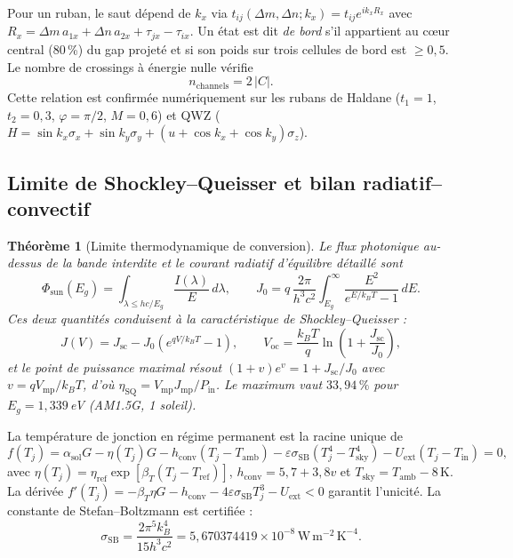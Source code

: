 \documentclass[11pt,a4paper,french]{article}
\newtheorem{theoreme}{Théorème}
\begin{document}
Pour un ruban, le saut dépend de $k_x$ via $t_{ij}(\Delta m,\Delta n;k_x)=t_{ij}e^{ik_xR_x}$ avec $R_x=\Delta m\,a_{1x}+\Delta n\,a_{2x}+\tau_{jx}-\tau_{ix}$. Un état est dit \emph{de bord} s'il appartient au cœur central (80\,\%) du gap projeté et si son poids sur trois cellules de bord est $\geq 0{,}5$. Le nombre de crossings à énergie nulle vérifie
\begin{equation}
  n_{\mathrm{channels}} = 2\,|C|.
  \label{eq:bulkedge}
\end{equation}
Cette relation est confirmée numériquement sur les rubans de Haldane ($t_1=1$, $t_2=0{,}3$, $\varphi=\pi/2$, $M=0{,}6$) et QWZ ($H=\sin k_x\sigma_x+\sin k_y\sigma_y+(u+\cos k_x+\cos k_y)\sigma_z$).

\subsection{Limite de Shockley--Queisser et bilan radiatif--convectif}

\begin{theoreme}[Limite thermodynamique de conversion]
Le flux photonique au-dessus de la bande interdite et le courant radiatif d'équilibre détaillé sont
\begin{equation}
  \Phi_{\mathrm{sun}}(E_g)=\int_{\lambda\leq hc/E_g}\frac{I(\lambda)}{E}\,d\lambda,
  \qquad
  J_0=q\,\frac{2\pi}{h^3c^2}\int_{E_g}^{\infty}\frac{E^2}{e^{E/k_BT}-1}\,dE.
  \label{eq:flux}
\end{equation}
Ces deux quantités conduisent à la caractéristique de Shockley--Queisser :
\begin{equation}
  J(V)=J_{\mathrm{sc}}-J_0\!\left(e^{qV/k_BT}-1\right),\qquad
  V_{\mathrm{oc}}=\frac{k_BT}{q}\ln\!\left(1+\frac{J_{\mathrm{sc}}}{J_0}\right),
  \label{eq:jv}
\end{equation}
et le point de puissance maximal résout $(1+v)e^v=1+J_{\mathrm{sc}}/J_0$ avec $v=qV_{\mathrm{mp}}/k_BT$, d'où $\eta_{\mathrm{SQ}}=V_{\mathrm{mp}}J_{\mathrm{mp}}/P_{\mathrm{in}}$. Le maximum vaut $33{,}94\,\%$ pour $E_g=1{,}339$\,eV (AM1.5G, 1 soleil).
\end{theoreme}

La température de jonction en régime permanent est la racine unique de
\begin{equation}
  f(T_j)=\alpha_{\mathrm{sol}}G-\eta(T_j)G-h_{\mathrm{conv}}(T_j-T_{\mathrm{amb}})
  -\varepsilon\sigma_{\mathrm{SB}}(T_j^4-T_{\mathrm{sky}}^4)-U_{\mathrm{ext}}(T_j-T_{\mathrm{in}})=0,
  \label{eq:bilan}
\end{equation}
avec $\eta(T_j)=\eta_{\mathrm{ref}}\exp[\beta_T(T_j-T_{\mathrm{ref}})]$, $h_{\mathrm{conv}}=5{,}7+3{,}8v$ et $T_{\mathrm{sky}}=T_{\mathrm{amb}}-8$\,K. La dérivée $f'(T_j)=-\beta_T\eta G-h_{\mathrm{conv}}-4\varepsilon\sigma_{\mathrm{SB}}T_j^3-U_{\mathrm{ext}}<0$ garantit l'unicité. La constante de Stefan--Boltzmann est certifiée :
\begin{equation}
  \sigma_{\mathrm{SB}}=\frac{2\pi^5k_B^4}{15h^3c^2}=5{,}670374419\times10^{-8}\,\mathrm{W\,m^{-2}\,K^{-4}}.
  \label{eq:sigma}
\end{equation}
\end{document}
